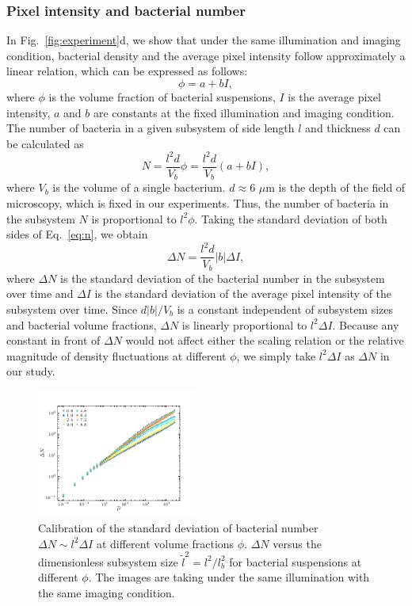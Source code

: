\documentclass[twocolumn,aps,prx,amsmath,amssymb,longbibliography,superscriptaddress]{revtex4-2}
\begin{document}
\subsubsection{Pixel intensity and bacterial number}
In Fig.~\ref{fig:experiment}d, we show that under the same illumination and imaging condition, bacterial density and the average pixel intensity follow approximately a linear relation, which can be expressed as follows:
\begin{equation}
\label{eq:phi-I-relation}
\phi = a + bI,
\end{equation}
where $\phi$ is the volume fraction of bacterial suspensions, $I$ is the average pixel intensity, $a$ and $b$ are constants at the fixed illumination and imaging condition. The number of bacteria in a given subsystem of side length $l$ and thickness $d$ can be calculated as
\begin{equation}
\label{eq:n}
N = \frac{l^2d}{V_b} \phi = \frac{l^2d}{V_b} (a+bI),
\end{equation}
where $V_b$ is the volume of a single bacterium. $d \approx 6$ $\mu$m is the depth of the field of microscopy, which is fixed in our experiments. Thus, the number of bacteria in the subsystem $N$ is proportional to $l^2 \phi$. Taking the standard deviation of both sides of Eq.~\ref{eq:n}, we obtain
\begin{equation}
\label{intensity-number}
\Delta N = \frac{l^2 d}{V_b}|b|\Delta I,
\end{equation}
where $\Delta N$ is the standard deviation of the bacterial number in the subsystem over time and $\Delta I$ is the standard deviation of the average pixel intensity of the subsystem over time. Since $d|b|/V_b$ is a constant independent of subsystem sizes and bacterial volume fractions, $\Delta N$ is linearly proportional to $l^2\Delta I$. Because any constant in front of $\Delta N$ would not affect either the scaling relation or the relative magnitude of density fluctuations at different $\phi$, we simply take $l^2\Delta I$ as $\Delta N$ in our study.


\begin{figure}[t]
	\begin{center}
		\includegraphics[width=0.47\textwidth]{Figures/fig-8.pdf}
		\caption[Density autocorrelation]
		{Calibration of the standard deviation of bacterial number $\Delta N \sim l^2\Delta I$ at different volume fractions $\phi$. $\Delta N$ versus the dimensionless subsystem size $\tilde{l}^2 = l^2/l_b^2$ for bacterial suspensions at different $\phi$. The images are taking under the same illumination with the same imaging condition.
		}
		\label{fig:same-conditions}
	\end{center}
\end{figure}
\end{document}
